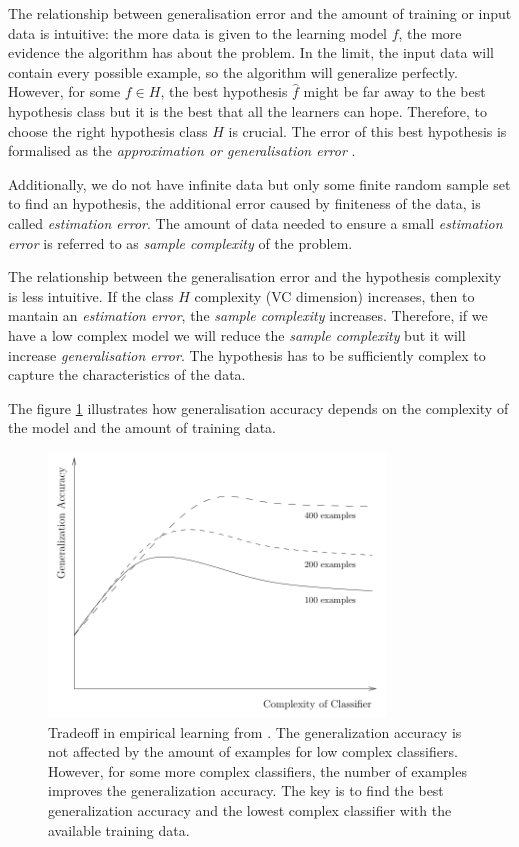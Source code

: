 The relationship between generalisation error and the amount of training or
input data is intuitive: the more data is given to the learning model $f$, the
more evidence the algorithm has about the problem. In the limit, the input data
will contain every possible example, so the algorithm will generalize perfectly.
However, for some $f \in H$, the best hypothesis $\hat{f}$ might be far away to
the best hypothesis class but it is the best that all the learners can hope.
Therefore, to choose the right hypothesis class $H$ is crucial. The error of
this best hypothesis is formalised as the {\em approximation or generalisation
error} \cite{niyogi1996relationship}.

Additionally, we do not have infinite data but only some finite random sample
set to find an hypothesis, the additional error caused by finiteness of the
data, is called {\em estimation error}. The amount of data needed to ensure a
small {\em estimation error} is referred to as {\em sample complexity} of the
problem.

The relationship between the generalisation error and the hypothesis complexity
is less intuitive. If the class $H$ complexity (VC dimension) increases, then to
mantain an {\em estimation error}, the {\em sample complexity} increases.
Therefore, if we have a low complex model we will reduce the {\em sample complexity}
but it will increase {\em generalisation error}. The hypothesis has to be
sufficiently complex to capture the characteristics of the data.

The figure \ref{fig:tradeoff} illustrates how generalisation
accuracy depends on the complexity of the model and the amount of training data.

\begin{figure}[!h]
  \centering
  \includegraphics[width=0.8\textwidth]{img/3tradeoff}
  \caption{Tradeoff in empirical learning from \cite{dietterich2003}. The
generalization accuracy is not affected by the amount of examples for low
complex classifiers. However, for some more complex classifiers, the number of
examples improves the generalization accuracy. The key is to find the best
generalization accuracy and the lowest complex classifier with the available
training data. }
  \label{fig:tradeoff}
\end{figure}

